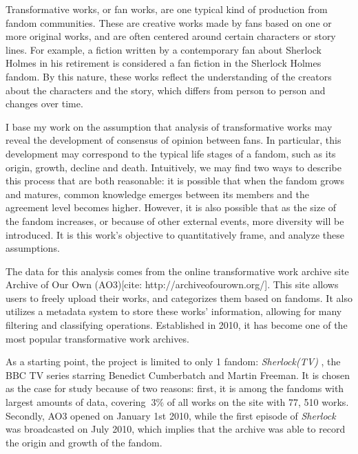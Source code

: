 \documentclass{pnastwo}
\begin{document}
\begin{article}
Transformative works, or fan works, are one typical kind of production from fandom communities. These are creative works made by fans based on one or more original works, and are often centered around certain characters or story lines. For example, a fiction written by a contemporary fan about Sherlock Holmes in his retirement is considered a fan fiction in the Sherlock Holmes fandom. By this nature, these works reflect the understanding of the creators about the characters and the story, which differs from person to person and changes over time.

I base my work on the assumption that analysis of transformative works may reveal the development of consensus of opinion between fans. In particular, this development may correspond to the typical life stages of a fandom, such as its origin, growth, decline and death. Intuitively, we may find two ways to describe this process that are both reasonable: it is possible that when the fandom grows and matures, common knowledge emerges between its members and the agreement level becomes higher. However, it is also possible that as the size of the fandom increases, or because of other external events, more diversity will be introduced. It is this work's objective to quantitatively frame, and analyze these assumptions.

The data for this analysis comes from the online transformative work archive site Archive of Our Own (AO3)[cite: http://archiveofourown.org/]. This site allows users to freely upload their works, and categorizes them based on fandoms. It also utilizes a metadata system to store these works' information, allowing for many filtering and classifying operations. Established in 2010, it has become one of the most popular transformative work archives.

As a starting point, the project is limited to only 1 fandom: \textit{Sherlock(TV) }, the BBC TV series starring Benedict Cumberbatch and Martin Freeman. It is chosen as the case for study because of two reasons: first, it is among the fandoms with largest amounts of data, covering $~3\%$ of all works on the site with 77, 510 works. Secondly, AO3 opened on January 1st 2010, while the first episode of \textit{Sherlock} was broadcasted  on July 2010, which implies that the archive was able to record the origin and growth of the fandom. 




\end{article}
\end{document}
